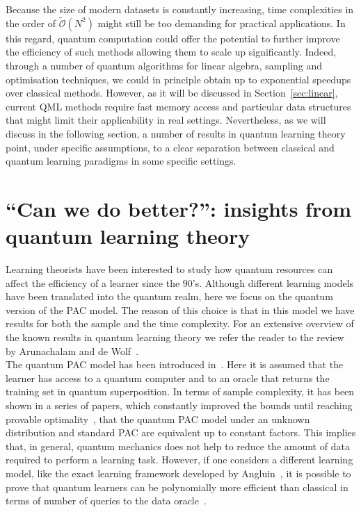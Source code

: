 \documentclass[a4paper, 11pt]{article}
\begin{document}
Because the size of modern datasets is constantly increasing, time complexities in the order of $\widetilde{ \mathcal{O}} (N^2)$ might still be too demanding for practical applications. In this regard, quantum computation could offer the potential to further improve the efficiency of such methods allowing them to scale up significantly. Indeed, through a number of quantum algorithms for linear algebra, sampling and optimisation techniques, we could in principle obtain up to exponential speedups over classical methods. However, as it will be discussed in Section~\ref{sec:linear}, current QML methods require fast memory access and particular data structures that might limit their applicability in real settings. Nevertheless, as we will discuss in the following section, a number of results in quantum learning theory point, under specific assumptions, to a clear separation between classical and quantum learning paradigms in some specific settings.


\section{``Can we do better?'': insights from quantum learning theory}
\label{sec:better}

Learning theorists have been interested to study how quantum resources can affect the efficiency of a learner since the $90$'s. Although different learning models have been translated into the quantum realm, here we focus on the quantum version of the PAC model. The reason of this choice is that in this model we have results for both the sample and the time complexity. For an extensive overview of the known results in quantum learning theory we refer the reader to the review by Arunachalam and de Wolf~\cite{arunachalam2017survey}.\\ 

The quantum PAC model has been introduced in~\cite{bshouty1998learning}. Here it is assumed that the learner has access to a quantum computer and to an oracle that returns the training set in quantum superposition. 
In terms of sample complexity, it has been shown in a series of papers, which constantly improved the bounds until reaching provable optimality~\cite{servedio2004equivalences,atici2005improved,zhang2010improved,arunachalam2016optimal}, that the quantum PAC model under an unknown distribution and standard PAC are equivalent up to constant factors. This implies that, in general, quantum mechanics does not help to reduce the amount of data required to perform a learning task. However, if one considers a different learning model, like the exact learning framework developed by Angluin~\cite{angluin1988queries}, it is possible to prove that quantum learners can be polynomially more efficient than classical in terms of number of queries to the data oracle~\cite{bshouty1994oracles,servedio2004equivalences}. \\
\end{document}
